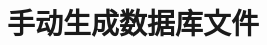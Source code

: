 \documentclass[fontset = none, t]{ctexbeamer}
\begin{document}
\section[手动生成]{手动生成数据库文件}

\end{document}
